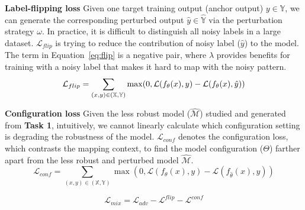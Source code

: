 \textbf{Label-flipping loss} Given one target training output (anchor output) $y\in\mathbb{Y}$, we can generate the corresponding perturbed output $\hat{y} \in \hat{\mathbb{Y}}$ via the perturbation strategy $\omega$. In practice, it is difficult to distinguish all noisy labels in a large dataset. $\mathcal{L}_{flip}$ is trying to reduce the contribution of noisy label ($\hat{y}$) to the model. The term in Equation~\eqref{eq:flip} is a negative pair, where $\lambda$ provides benefits for training with a noisy label that makes it hard to map with the noisy pattern. 
\begin{equation}\label{eq:flip}
    \mathcal{L}_{flip} = \sum_{(x,y) \in (\mathbb{X},\mathbb{Y})} \max (0, \mathcal{L}(f_{\theta}(x),y)-\mathcal{L}(f_{\theta}(x),\hat{y}))\\ 
\end{equation}

\textbf{Configuration loss} Given the less robust model ($\hat{\mathcal{M}}$) studied and generated from \textbf{Task 1}, intuitively, we cannot linearly calculate which configuration setting is degrading the robustness of the model. $\mathcal{L}_{conf}$ denotes the configuration loss, which contrasts the mapping context, to find the model configuration ($\Theta$) farther apart from the less robust and perturbed model $\hat{\mathcal{M}}$.
\begin{equation}
    \mathcal{L}_{conf} = \sum_{(x,y) \in (\mathbb{X},\mathbb{Y})} \max (0, \mathcal{L}(f_{\theta}(x),y)-\mathcal{L}(f_{\hat{\theta}}(x),y))
\end{equation}

\begin{equation}
    \mathcal{L}_{mix} = \mathcal{L}_{adv} - \mathcal{L}^{flip}-\mathcal{L}^{conf}
\end{equation}









